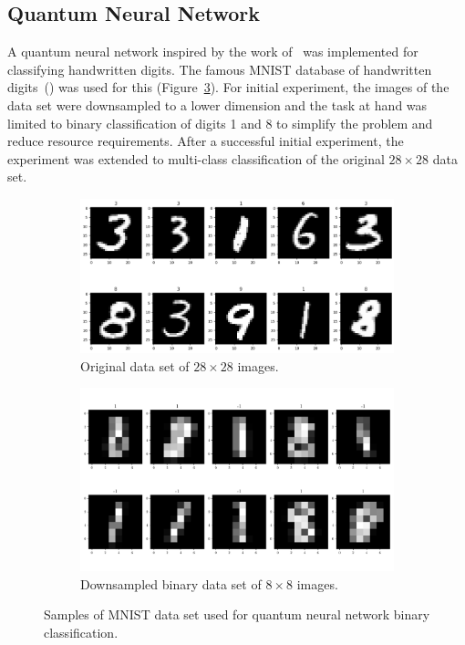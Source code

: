 \documentclass[a4paper,10pt]{article}
\begin{document}
\subsection{Quantum Neural Network}
A quantum neural network inspired by the work of~\cite{qnn-near-term} was implemented for classifying handwritten digits.
The famous MNIST database of handwritten digits~(\cite{mnist-digits}) was used for this (Figure~\ref{fig:mnist}).
For initial experiment, the images of the data set were downsampled to a lower dimension and the task at hand was limited to binary classification of digits 1 and 8 to simplify the problem and reduce resource requirements.
After a successful initial experiment, the experiment was extended to multi-class classification of the original $28 \times 28$ data set.
\begin{figure}[ht]
	\centering
	\begin{subfigure}{.5\textwidth}
		\centering
		\includegraphics[width=.85\linewidth]{figures/mnist_28x28.png}
		\caption{Original data set of $28 \times 28$ images.}
		\label{fig:mnist_28x28}
	\end{subfigure}%
	\begin{subfigure}{.5\textwidth}
		\centering
		\includegraphics[width=.85\linewidth]{figures/mnist_8x8}
		\caption{Downsampled binary data set of $8 \times 8$ images.}
		\label{fig:mnist_8x8}
	\end{subfigure}
	\caption{Samples of MNIST data set used for quantum neural network binary classification.}
	\label{fig:mnist}
\end{figure}
\end{document}
